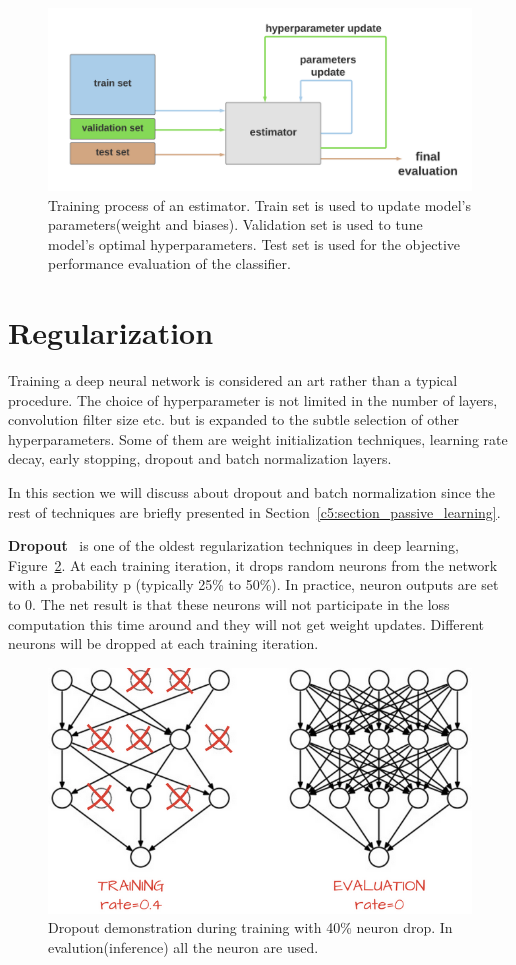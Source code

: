 \begin{figure}[h!]
    \centering  
    \includegraphics[width=.8\textwidth]{figures/chap3/ml/train_valid_test}
    \caption{Training process of an estimator. Train set is used to update model's parameters(weight and biases). Validation set is used to tune model's optimal hyperparameters. Test set is used for the objective performance evaluation of the classifier.}
    \label{c3:fig_train_val_test}
\end{figure}


\section{Regularization}

Training a deep neural network is considered an art rather than a typical procedure. The choice of hyperparameter is not limited in the number of layers, convolution filter size etc.  but is expanded to the subtle selection of other hyperparameters. Some of them are weight initialization techniques, learning rate decay, early stopping, dropout and batch normalization layers.

In this section we will discuss about dropout and batch normalization since the rest of techniques are briefly presented in Section~\ref{c5:section_passive_learning}.

\textbf{Dropout}~\cite{srivastava2014dropout} is one of the oldest regularization techniques in deep learning, Figure~\ref{c3:fig_dropout}. At each training iteration, it drops random neurons from the network with a probability p (typically 25\% to 50\%). In practice, neuron outputs are set to 0. The net result is that these neurons will not participate in the loss computation this time around and they will not get weight updates. Different neurons will be dropped at each training iteration.

\begin{figure}[h!]
    \centering  
    \includegraphics[width=.7\textwidth]{figures/chap3/ml/dropout}
    \caption{Dropout demonstration during training with 40\% neuron drop. In evalution(inference) all the neuron are used.}
    \label{c3:fig_dropout}
\end{figure}

